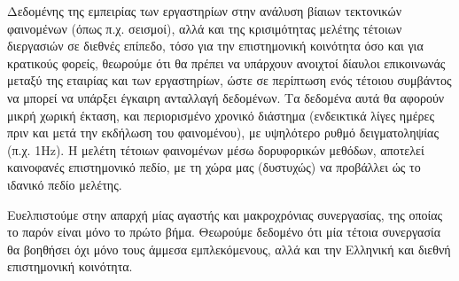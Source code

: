 \documentclass[11pt]{article}
\begin{document}
Δεδομένης της εμπειρίας των εργαστηρίων στην ανάλυση βίαιων τεκτονικών φαινομένων (όπως π.χ. σεισμοί), αλλά και της κρισιμότητας μελέτης τέτοιων διεργασιών σε διεθνές επίπεδο, τόσο για την επιστημονική κοινότητα όσο και για κρατικούς φορείς, θεωρούμε ότι θα πρέπει να υπάρχουν ανοιχτοί δίαυλοι επικοινωνάς μεταξύ της εταιρίας και των εργαστηρίων, ώστε σε περίπτωση ενός τέτοιου συμβάντος να μπορεί να υπάρξει έγκαιρη ανταλλαγή δεδομένων. Τα δεδομένα αυτά θα αφορούν μικρή χωρική έκταση, και περιορισμένο χρονικό διάστημα (ενδεικτικά λίγες ημέρες πριν και μετά την εκδήλωση του φαινομένου), με υψηλότερο ρυθμό δειγματοληψίας (π.χ. 1Hz). Η μελέτη τέτοιων φαινομένων μέσω δορυφορικών μεθόδων, αποτελεί καινοφανές επιστημονικό πεδίο, με τη χώρα μας (δυστυχώς)  να προβάλλει ώς το ιδανικό πεδίο μελέτης.

Ευελπιστούμε στην απαρχή μίας αγαστής και μακροχρόνιας συνεργασίας, της οποίας το παρόν είναι μόνο το πρώτο βήμα. Θεωρούμε δεδομένο ότι μία τέτοια συνεργασία θα βοηθήσει όχι μόνο τους άμμεσα εμπλεκόμενους, αλλά και την Ελληνική και διεθνή επιστημονική κοινότητα.




\end{document}
